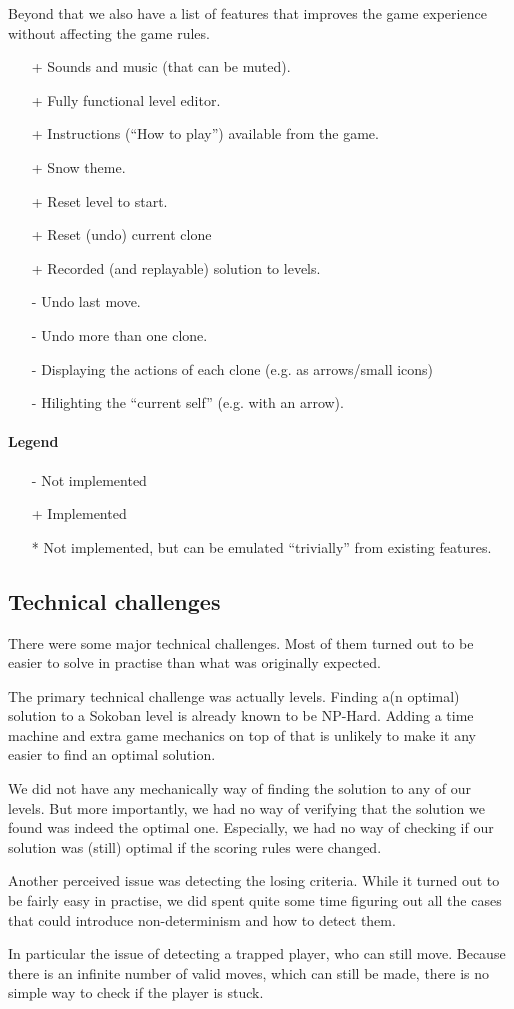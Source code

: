 Beyond that we also have a list of features that improves the game
experience without affecting the game rules.

\begin{itemize}
\item[+] Sounds and music (that can be muted).
\item[+] Fully functional level editor.
\item[+] Instructions (``How to play'') available from the game.
\item[+] Snow theme.
\item[+] Reset level to start.
\item[+] Reset (undo) current clone
\item[+] Recorded (and replayable) solution to levels.
\item[-] Undo last move.
\item[-] Undo more than one clone.
\item[-] Displaying the actions of each clone (e.g. as arrows/small icons)
\item[-] Hilighting the ``current self'' (e.g. with an arrow).
\end{itemize}

\paragraph{Legend}
\begin{itemize}
\item[-] Not implemented
\item[+] Implemented
\item[*] Not implemented, but can be emulated ``trivially'' from existing
 features.
\end{itemize}

\subsection{Technical challenges}
There were some major technical challenges.  Most of them turned out to be
easier to solve in practise than what was originally expected.

The primary technical challenge was actually levels.  Finding a(n
optimal) solution to a Sokoban level is already known to be NP-Hard.
Adding a time machine and extra game mechanics on top of that is
unlikely to make it any easier to find an optimal solution.

We did not have any mechanically way of finding the solution to any of
our levels.  But more importantly, we had no way of verifying that the
solution we found was indeed the optimal one.  Especially, we had no
way of checking if our solution was (still) optimal if the scoring rules
were changed.

Another perceived issue was detecting the losing criteria.  While it
turned out to be fairly easy in practise, we did spent quite some time
figuring out all the cases that could introduce non-determinism and
how to detect them.

In particular the issue of detecting a trapped player, who can still
move. Because there is an infinite number of valid moves, which can
still be made, there is no simple way to check if the player is stuck.

